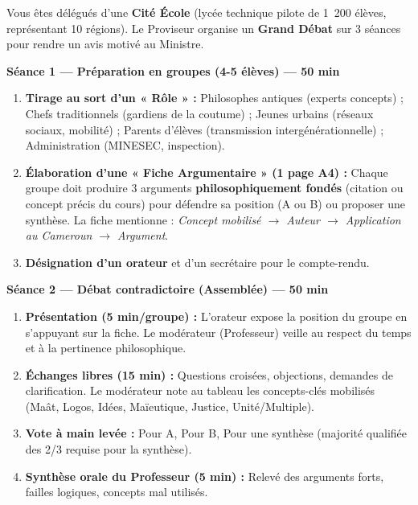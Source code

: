 \documentclass[11pt]{article}
\newcounter{popsec}
\newcounter{popsub}
\newcommand{\courssub}[1]{%
  \stepcounter{popsub}%
  \par\vspace{9pt}\noindent{\popxbold\fontsize{11.5}{13}\selectfont\color{popink}{\color{poporange}\thepopsec.\thepopsub}\hspace{6pt}#1}\par\nopagebreak\vspace{4pt}
}
\begin{document}
Vous êtes délégués d'une \textbf{Cité École} (lycée technique pilote de 1~200 élèves, représentant 10 régions). Le Proviseur organise un \textbf{Grand Débat} sur 3 séances pour rendre un avis motivé au Ministre.

\courssub{Consignes}
\textbf{Séance 1 — Préparation en groupes (4-5 élèves) — 50 min}
\begin{enumerate}
    \item \textbf{Tirage au sort d'un « Rôle » :} Philosophes antiques (experts concepts) ; Chefs traditionnels (gardiens de la coutume) ; Jeunes urbains (réseaux sociaux, mobilité) ; Parents d'élèves (transmission intergénérationnelle) ; Administration (MINESEC, inspection).
    \item \textbf{Élaboration d'une « Fiche Argumentaire » (1 page A4) :} Chaque groupe doit produire 3 arguments \textbf{philosophiquement fondés} (citation ou concept précis du cours) pour défendre sa position (A ou B) ou proposer une synthèse. La fiche mentionne : \emph{Concept mobilisé $\rightarrow$ Auteur $\rightarrow$ Application au Cameroun $\rightarrow$ Argument}.
    \item \textbf{Désignation d'un orateur} et d'un secrétaire pour le compte-rendu.
\end{enumerate}

\textbf{Séance 2 — Débat contradictoire (Assemblée) — 50 min}
\begin{enumerate}
    \item \textbf{Présentation (5 min/groupe) :} L'orateur expose la position du groupe en s'appuyant sur la fiche. Le modérateur (Professeur) veille au respect du temps et à la pertinence philosophique.
    \item \textbf{Échanges libres (15 min) :} Questions croisées, objections, demandes de clarification. Le modérateur note au tableau les concepts-clés mobilisés (Maât, Logos, Idées, Maïeutique, Justice, Unité/Multiple).
    \item \textbf{Vote à main levée :} Pour A, Pour B, Pour une synthèse (majorité qualifiée des 2/3 requise pour la synthèse).
    \item \textbf{Synthèse orale du Professeur (5 min) :} Relevé des arguments forts, failles logiques, concepts mal utilisés.
\end{enumerate}
\end{document}
